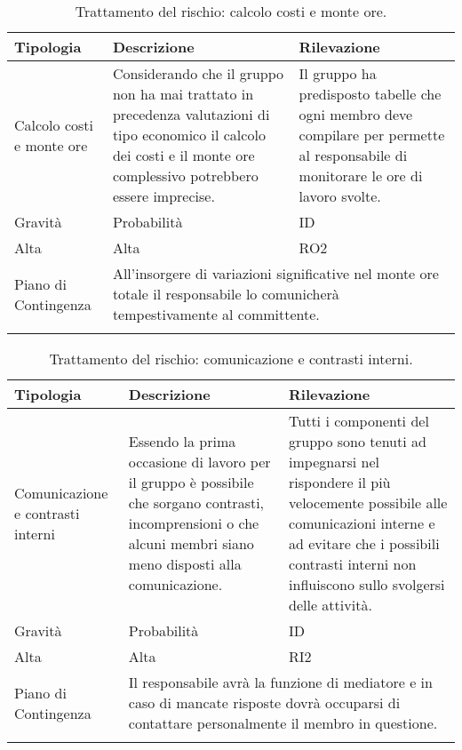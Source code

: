 \break

\begin{center}
	\begin{longtable}{| p{5cm} | p{5cm} | p{5cm} |}
		\hline
		\rowcolor[HTML]{F9CB9C} 
		Tipologia & Descrizione & Rilevazione \\ \hline
		Calcolo costi e monte ore & Considerando che il gruppo non ha mai trattato in precedenza valutazioni di tipo economico il calcolo dei costi e il monte ore complessivo potrebbero essere imprecise.  & Il gruppo ha predisposto tabelle che ogni membro deve compilare per permette al responsabile di monitorare le ore di lavoro svolte. \\ \hline
		\rowcolor[HTML]{F9CB9C} 
		Gravità & Probabilità & ID  \\ \hline
		Alta & Alta & RO2  \\ \hline
		\cellcolor[HTML]{F9CB9C} Piano di Contingenza & \multicolumn{2}{|p{10cm}|}{All’insorgere di variazioni significative nel monte ore totale il responsabile lo comunicherà tempestivamente al committente. } \\ \hline
		\caption{Trattamento del rischio: calcolo costi e monte ore.}
		\label{fig: Trattamento del rischio: calcolo costi e monte ore.}
	\end{longtable}
\end{center}

\begin{center}
	\begin{longtable}{| p{5cm} | p{5cm} | p{5cm} |}
		\hline
		\rowcolor[HTML]{F9CB9C} 
		Tipologia & Descrizione & Rilevazione \\ \hline
		Comunicazione e contrasti interni & Essendo la prima occasione di lavoro per il gruppo è possibile che sorgano contrasti, incomprensioni o che alcuni membri siano meno disposti alla comunicazione.  & Tutti i componenti del gruppo sono tenuti ad impegnarsi nel rispondere il più velocemente possibile alle comunicazioni interne e ad evitare che i possibili contrasti interni non influiscono sullo svolgersi delle attività. \\ \hline
		\rowcolor[HTML]{F9CB9C} 
		Gravità & Probabilità & ID  \\ \hline
		Alta & Alta & RI2  \\ \hline
		\cellcolor[HTML]{F9CB9C} Piano di Contingenza & \multicolumn{2}{|p{10cm}|}{Il responsabile avrà la funzione di mediatore e in caso di mancate risposte dovrà occuparsi di contattare personalmente il membro in questione. } \\ \hline
		\caption{Trattamento del rischio: comunicazione e contrasti interni.}
		\label{fig: Trattamento del rischio: comunicazione e contrasti interni.}
	\end{longtable}
\end{center}

